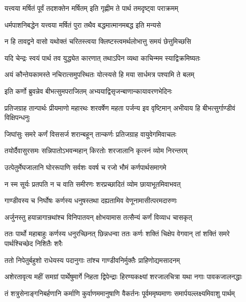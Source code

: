 \twolineshloka
{यत्त्वया मर्षितं पूर्वं तदशक्तेन मर्षितम्}
{इति गृह्णीम ते पार्थ तमदृष्ट्वा पराक्रमम्}


\twolineshloka
{धर्मपाशनिबद्धेन यत्त्वया मर्षितं पुरा}
{तथैव बद्धमात्मानमबद्ध इति मन्यसे}


\twolineshloka
{न हि तावद्वने वासो यथोक्तं चरितस्त्वया}
{क्लिष्टस्त्वमर्थलोभात्तु समयं छेत्तुमिच्छसि}


\twolineshloka
{यदि चेन्द्रः स्वयं पार्थ तव युद्ध्येत कारणात्}
{तथाऽपिन व्यथा काचिन्मम स्याद्विक्रमिष्यतः}


\twolineshloka
{अयं कौन्तेयकामस्ते नचिरात्समुपस्थितः}
{योत्स्यसे हि मया सार्धमत्र पश्यामि ते बलम्}



\twolineshloka
{इति कर्णो ब्रुवन्नेव बीभत्सुमपराजितम्}
{अभ्ययाद्विसृजन्बाणान्कायावरणभेदिनः}


\onelineshloka
{प्रतिजग्राह तान्पार्थः प्रीयमाणो महारथः}
\twolineshloka
{शरवर्षेण महता पर्जन्य इव वृष्टिमान्}
{अभीयाय हि बीभत्सुर्गाण्डीवं विक्षिपन्धनुः}


\twolineshloka
{जिघांसुः समरे कर्णं विससर्ज शरान्बहून्}
{तान्कर्णः प्रतिजग्राह वायुवेगमिवाचलः}


\twolineshloka
{तयोर्दैवासुरसमः सन्निपातोऽभवन्महान्}
{किरतोः शरजालानि कृत्स्नं व्योम निरन्तरम्}


\twolineshloka
{उत्पेतुर्मेघजालानि घोररूपाणि सर्वशः}
{ववर्ष च रजो भौमं कर्णपार्थसमागमे}


\twolineshloka
{न स्म सूर्यः प्रतपति न च वाति समीरणः}
{शरप्रच्छादितं व्योम छायाभूतमिवाभवत्}


\twolineshloka
{गाण्डीवस्य च निर्घोषः कर्णस्य धनुषस्तथा}
{दह्यतामिव वेणूनामासीत्परमदारुणः}


\twolineshloka
{अर्जुनस्तु हयान्नागान्रथांश्च विनिपातयन्}
{क्षोभयामास तत्सैन्यं कर्णं विव्याध चासकृत्}


\threelineshloka
{ततः पार्थो महाबाहुः कर्णस्य धनुरच्छिनत्}
{छिन्नधन्वा ततः कर्णः शक्तिं चिक्षेप वेगवान्}
{तां शक्तिं समरे पार्थश्चिच्छेद निशितैः शरैः}


\twolineshloka
{ततो निपेतुर्बहुशो राधेयस्य पदानुगाः}
{तांश्च गाण्डीवनिर्मुक्तैः प्राहिणोद्यमसादनम्}


\twolineshloka
{अशेरतावृत्य महीं समग्रां पार्थेषुमार्गे निहता द्विपेन्द्राः}
{हिरण्यकक्ष्यां शरजालचित्रा यथा नगाः पावकजालनद्धाः}


\twolineshloka
{तं शत्रुसेनाङ्गनिबर्हणानि कर्माणि कुर्वाणममानुषाणि}
{वैकर्तनः पूर्वममृष्यमाणः समार्पयल्लक्ष्यमिवाशु पार्थम्}


